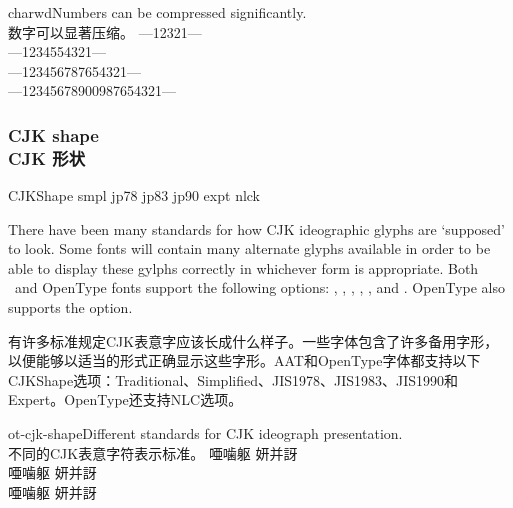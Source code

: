 \documentclass[a4paper]{l3doc}
\begin{document}
\begin{Xexample}[firstline=2]{charwd}{Numbers can be compressed significantly.\\数字可以显著压缩。}
  \centering
  {
   ---12321---}\\
  {
   ---1234554321---}\\
  {
   ---123456787654321---}\\
  {
   ---12345678900987654321---}
\end{Xexample}


\subsubsection{CJK shape\\CJK 形状}

\begin{features}{CJKShape}
 {smpl}
    {jp78}
    {jp83}
    {jp90}
     {expt}
        {nlck}
\end{features}

There have been many standards for how CJK ideographic
glyphs are `supposed' to look. Some fonts will contain many alternate
glyphs available in order to be able to display these gylphs
correctly in whichever form is appropriate. Both \AAT\ and OpenType
fonts support the following  options:
, , , ,
, and . OpenType also supports the  option.

有许多标准规定CJK表意字应该长成什么样子。一些字体包含了许多备用字形，以便能够以适当的形式正确显示这些字形。AAT和OpenType字体都支持以下CJKShape选项：Traditional、Simplified、JIS1978、JIS1983、JIS1990和Expert。OpenType还支持NLC选项。

\begin{Xexample}[firstline=2]{ot-cjk-shape}{Different standards for CJK ideograph presentation.\\不同的CJK表意字符表示标准。}
  \LARGE\def\text{ 唖噛躯 妍并訝}
  {
  \text }                          \\
  {
  \text }                          \\
  {
  \text }
\end{Xexample}
\end{document}
